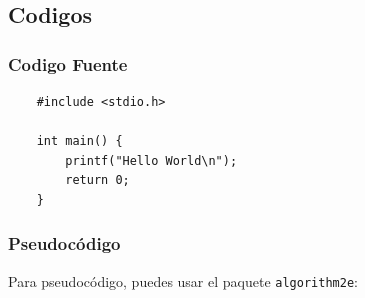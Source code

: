 \subsection{Codigos}


\subsubsection{Codigo Fuente}

\begin{verbatim}
    #include <stdio.h>

    int main() {
        printf("Hello World\n");
        return 0;
    }
\end{verbatim}


\subsubsection{Pseudocódigo}

Para pseudocódigo, puedes usar el paquete \texttt{algorithm2e}:

\begin{algorithm}[H]
    \SetAlgoLined
    \caption{Algoritmo de suma}
    \label{alg:suma}
\end{algorithm}
